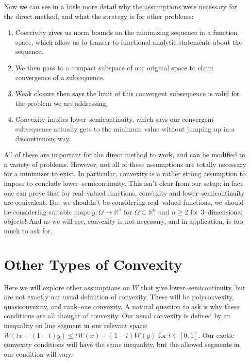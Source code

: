 \documentclass[../main.tex]{subfiles}
\begin{document}
Now we can see in a little more detail why the assumptions were necessary for the direct method, and what the strategy is for other problems:

\begin{enumerate}
	\item Coercivity gives us norm bounds on the minimizing sequence in a function space, which allow us to transer to functional analytic statements about the sequence.
	\item We then pass to a compact subspace of our original space to claim convergence of a subsequence.
	\item Weak closure then says the limit of this convergent subsequence is valid for the problem we are addressing.
	\item Convexity implies lower--semicontinuity, which says our convergent subsequence actually gets to the minimum value without jumping up in a discontinuous way.
\end{enumerate}


All of these are important for the direct method to work, and can be modified to a variety of problems.
However, not all of these assumptions are totally necessary for a minimizer to exist.
In particular, convexity is a rather strong assumption to impose to conclude lower--semicontinuity.
This isn't clear from our setup; in fact one can prove that for real--valued functions, convexity and lower--semicontinuity are equivalent.
But we shouldn't be considering real--valued functions, we should be considering suitable maps $y: \Omega \to \mathbb{R}^n$ for $\Omega \subset \mathbb{R}^n$ and $n \geq 2$ for 3--dimensional objects!
And as we will see, convexity is not necessary, and in application, is too much to ask for.

\section{Other Types of Convexity}

Here we will explore other assumptions on $W$ that give lower--semicontinuity, but are not exactly our usual definition of convexity.
These will be polyconvexity, quasiconvexity, and rank--one convexity.
A natural question to ask is why these conditions are all thought of convexity.
Our usual convexity is defined by an inequality on line segment in our relevant space: $W(tx + (1-t)y) \leq t W(x) + (1-t) W(y)$ for $t \in [0,1]$.
Our exotic convexity conditions will have the same inequality, but the allowed segments in our condition will vary. \\
\end{document}
